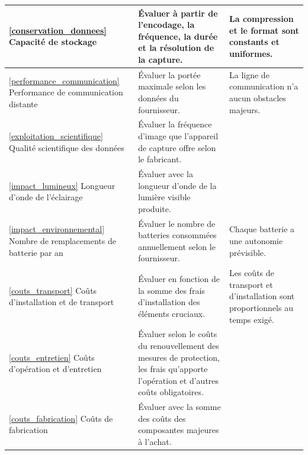 \begin{longtable}{|L{4cm}|L{6cm}|L{6cm}|}
\ref{conservation_donnees} Capacité de stockage
    & Évaluer à partir de l'encodage, la fréquence, la durée et la résolution de la capture.
    & La compression et le format sont constants et uniformes.
\\
\hline

\ref{performance_communication} Performance de communication distante
    & Évaluer la portée maximale selon les données du fournisseur.
    & La ligne de communication n'a aucun obstacles majeurs.
\\
\hline

\ref{exploitation_scientifique} Qualité scientifique des données
    & Évaluer la fréquence d'image que l'appareil de capture offre selon le fabricant.
    &
\\
\hline

\ref{impact_lumineux} Longueur d'onde de l'éclairage
    & Évaluer avec la longueur d'onde de la lumière visible produite.
    &
\\
\hline

\ref{impact_environnemental} Nombre de remplacements de batterie par an
    & Évaluer le nombre de batteries consommées annuellement selon le fournisseur.
    & Chaque batterie a une autonomie prévisible.
\\
\hline

\ref{couts_transport} Coûts d'installation et de transport
    & Évaluer en fonction de la somme des frais d'installation des éléments cruciaux.
    & Les coûts de transport et d'installation sont proportionnels au temps exigé.
\\
\hline

\ref{couts_entretien} Coûts d'opération et d'entretien
    & Évaluer selon le coûts du renouvellement des mesures de protection, les frais qu'apporte l'opération et d'autres coûts obligatoires.
    &
\\
\hline

\ref{couts_fabrication} Coûts de fabrication
    & Évaluer avec la somme des coûts des composantes majeures à l'achat.
    &
\\
\hline

\end{longtable}


\renewcommand{\arraystretch}{1.5}

